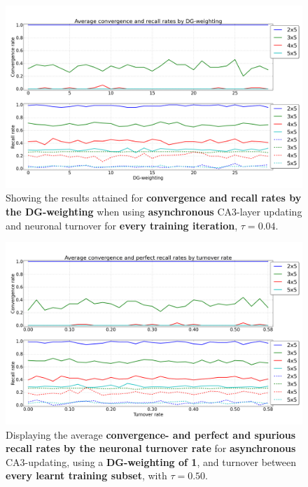 \begin{figure}
    \centering
    \includegraphics[width=13cm]{fig/DGWs/async_tm1_04}
    \caption{Showing the results attained for \textbf{convergence and recall rates by the DG-weighting} when using \textbf{asynchronous} CA3-layer updating and neuronal turnover for \textbf{every training iteration}, $\tau=0.04$.}
    \label{fig:async_tm1_04}
\end{figure}


\begin{figure}
    \centering
    \includegraphics[width=13cm]{fig/turnover_rates/async_tm0_dgw25}
    \caption{Displaying the average \textbf{convergence- and perfect and spurious recall rates by the neuronal turnover rate} for \textbf{asynchronous} CA3-updating, using a \textbf{DG-weighting of 1}, and turnover between \textbf{every learnt training subset}, with $\tau=0.50$.}
    \label{fig:async_tm0_dgw25}
\end{figure}

